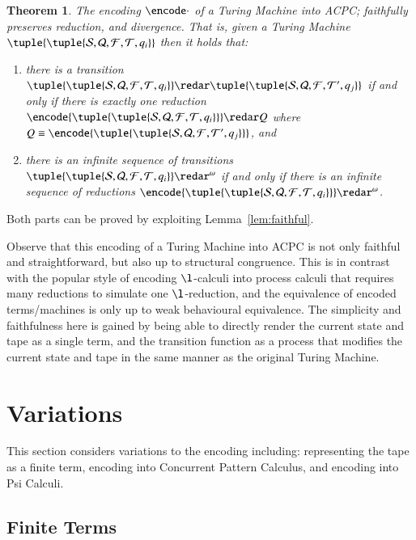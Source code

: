 \documentclass[submission,copyright,creativecommons]{eptcs}
\newtheorem{theorem}{Theorem}[section]
\newenvironment{proof}[1][Proof]{\begin{trivlist}
\item[\hskip \labelsep {\bfseries #1}]}{\end{trivlist}}
\newcommand{\tmach}[1]{\tuple{\tuple{#1}}}
\begin{document}
\begin{theorem}
\label{thm:done}
The encoding $\encode\cdot$ of a Turing Machine into ACPC; faithfully preserves reduction, and
divergence.
That is, given a Turing Machine $\tmach{{\mathcal S}, {\mathcal Q}, {\mathcal F}, {\mathcal T}, q_i}$
then it holds that:
\begin{enumerate}
\item there is a transition
$\tmach{{\mathcal S}, {\mathcal Q}, {\mathcal F}, {\mathcal T}, q_i}\redar
\tmach{{\mathcal S}, {\mathcal Q}, {\mathcal F}, {\mathcal T}', q_j}$
if and only if there is exactly one reduction
$\encode{\tmach{{\mathcal S}, {\mathcal Q}, {\mathcal F}, {\mathcal T}, q_i}}\redar Q$
where $Q\equiv\encode{\tmach{{\mathcal S}, {\mathcal Q}, {\mathcal F}, {\mathcal T}', q_j}}$, and
\item there is an infinite sequence of transitions
$\tmach{{\mathcal S}, {\mathcal Q}, {\mathcal F}, {\mathcal T}, q_i}\redar^\omega$
if and only if there is an infinite sequence of reductions
$\encode{\tmach{{\mathcal S}, {\mathcal Q}, {\mathcal F}, {\mathcal T}, q_i}}\redar^\omega$.
\end{enumerate}
\end{theorem}
\begin{proof}
Both parts can be proved by exploiting Lemma~\ref{lem:faithful}.
\end{proof}

Observe that this encoding of a Turing Machine into ACPC is not only faithful
and straightforward, but also up to structural congruence.
This is in contrast with the popular style of encoding $\l$-calculi into process
calculi that requires many reductions to simulate one $\l$-reduction, and the
equivalence of encoded terms/machines is only up to weak behavioural equivalence.
The simplicity and faithfulness here is gained by being able to directly render
the current state and tape as a single term, and the transition function as a
process that modifies the current state and tape in the same manner as the original
Turing Machine.

\section{Variations}
\label{sec:var}

This section considers variations to the encoding including:
representing the tape as a finite term,
encoding into Concurrent Pattern Calculus,
and encoding into Psi Calculi.

\subsection*{Finite Terms}
\end{document}
